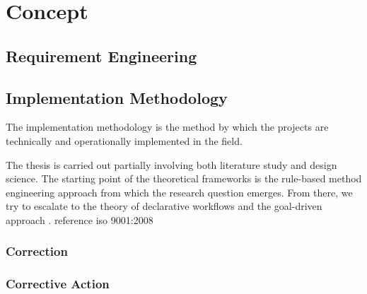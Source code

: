 \chapter{Concept}

\section{Requirement Engineering}

\section{Implementation Methodology}
The implementation methodology is the method by which the projects are technically and operationally implemented in the field.

The thesis is carried out partially involving both literature study and design
science. The starting point of the theoretical frameworks is the rule-based method
engineering approach \citep{10.1007/978-3-642-19997-4_17} from which the research question
emerges. From there, we try to escalate to the theory of declarative workflows \citep{vanderAalst2009DeclarativeSupport} and the goal-driven approach \citep{Lamsweerde2009RequirementsSpecifications}.
reference iso 9001:2008
\subsection{Correction}
\subsection{Corrective Action}

\blindtext
\enlargethispage{\baselineskip} %